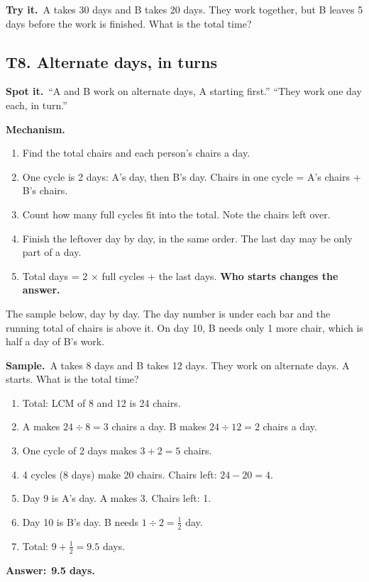 \documentclass[11pt,a4paper]{article}
\let\oldsubsection\subsection
\renewcommand{\subsection}{\needspace{9\baselineskip}\oldsubsection}
\newcommand{\spot}{\textbf{\color{ember}Spot it.}\ }
\newcommand{\mech}{\textbf{\color{ember}Mechanism.}\ }
\newif\ifkeepsamp
\newcommand{\ans}[1]{\par\nopagebreak\noindent\textbf{\color{ember}Answer:}\ \textbf{#1}\par}
\newcommand{\samp}{\ifkeepsamp\needspace{4\baselineskip}\fi\textbf{\color{ember}Sample.}\ }
\newcommand{\tryit}[1]{\textbf{\color{ember}Try it.}\ #1}
\begin{document}
\tryit A takes 30 days and B takes 20 days. They work together, but B leaves 5 days before the work is finished. What is the total time?

\subsection{T8. Alternate days, in turns}
\spot ``A and B work on alternate days, A starting first.'' ``They work one day each, in turn.''

\mech
\begin{enumerate}
\item Find the total chairs and each person's chairs a day.
\item One cycle is 2 days: A's day, then B's day. Chairs in one cycle = A's chairs + B's chairs.
\item Count how many full cycles fit into the total. Note the chairs left over.
\item Finish the leftover day by day, in the same order. The last day may be only part of a day.
\item Total days = 2 $\times$ full cycles + the last days. \textbf{Who starts changes the answer.}
\end{enumerate}

\begin{center}
\par\nopagebreak\smallskip
{\small The sample below, day by day. The day number is under each bar and the running total of chairs is above it. On day 10, B needs only 1 more chair, which is half a day of B's work.}
\end{center}

\samp A takes 8 days and B takes 12 days. They work on alternate days. A starts. What is the total time?
\begin{enumerate}
\item Total: LCM of 8 and 12 is 24 chairs.
\item A makes $24 \div 8 = 3$ chairs a day. B makes $24 \div 12 = 2$ chairs a day.
\item One cycle of 2 days makes $3 + 2 = 5$ chairs.
\item 4 cycles (8 days) make 20 chairs. Chairs left: $24 - 20 = 4$.
\item Day 9 is A's day. A makes 3. Chairs left: 1.
\item Day 10 is B's day. B needs $1 \div 2 = \tfrac12$ day.
\item Total: $9 + \tfrac12 = 9.5$ days.
\end{enumerate}
\ans{9.5 days.}
\end{document}
